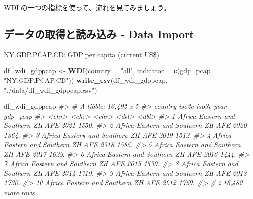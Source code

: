 \documentclass[
  xelatex, ja=standard]{bxjsbook}
\newenvironment{Shaded}{\begin{snugshade}}{\end{snugshade}}
\newcommand{\AttributeTok}[1]{\textcolor[rgb]{0.13,0.29,0.53}{#1}}
\newcommand{\CommentTok}[1]{\textcolor[rgb]{0.56,0.35,0.01}{\textit{#1}}}
\newcommand{\FunctionTok}[1]{\textcolor[rgb]{0.13,0.29,0.53}{\textbf{#1}}}
\newcommand{\NormalTok}[1]{#1}
\newcommand{\OtherTok}[1]{\textcolor[rgb]{0.56,0.35,0.01}{#1}}
\newcommand{\StringTok}[1]{\textcolor[rgb]{0.31,0.60,0.02}{#1}}
\theoremstyle{definition}
\theoremstyle{definition}
\theoremstyle{definition}
\theoremstyle{definition}
\theoremstyle{remark}
\begin{document}
WDI の一つの指標を使って、流れを見てみましょう。

\hypertarget{ux30c7ux30fcux30bfux306eux53d6ux5f97ux3068ux8aadux307fux8fbcux307f---data-import}{%
\subsection{データの取得と読み込み - Data Import}\label{ux30c7ux30fcux30bfux306eux53d6ux5f97ux3068ux8aadux307fux8fbcux307f---data-import}}

NY.GDP.PCAP.CD: GDP per capita (current US\$)

\begin{Shaded}
\begin{Highlighting}[]
\NormalTok{df\_wdi\_gdppcap }\OtherTok{\textless{}{-}} \FunctionTok{WDI}\NormalTok{(}\AttributeTok{country =} \StringTok{"all"}\NormalTok{, }\AttributeTok{indicator =} \FunctionTok{c}\NormalTok{(}\AttributeTok{gdp\_pcap =} \StringTok{"NY.GDP.PCAP.CD"}\NormalTok{))}
\FunctionTok{write\_csv}\NormalTok{(df\_wdi\_gdppcap, }\StringTok{"./data/df\_wdi\_gdppcap.csv"}\NormalTok{)}
\end{Highlighting}
\end{Shaded}

\begin{Shaded}
\begin{Highlighting}[]
\NormalTok{df\_wdi\_gdppcap}
\CommentTok{\#\textgreater{} \# A tibble: 16,492 x 5}
\CommentTok{\#\textgreater{}    country                     iso2c iso3c  year gdp\_pcap}
\CommentTok{\#\textgreater{}    \textless{}chr\textgreater{}                       \textless{}chr\textgreater{} \textless{}chr\textgreater{} \textless{}dbl\textgreater{}    \textless{}dbl\textgreater{}}
\CommentTok{\#\textgreater{}  1 Africa Eastern and Southern ZH    AFE    2021    1550.}
\CommentTok{\#\textgreater{}  2 Africa Eastern and Southern ZH    AFE    2020    1364.}
\CommentTok{\#\textgreater{}  3 Africa Eastern and Southern ZH    AFE    2019    1512.}
\CommentTok{\#\textgreater{}  4 Africa Eastern and Southern ZH    AFE    2018    1565.}
\CommentTok{\#\textgreater{}  5 Africa Eastern and Southern ZH    AFE    2017    1629.}
\CommentTok{\#\textgreater{}  6 Africa Eastern and Southern ZH    AFE    2016    1444.}
\CommentTok{\#\textgreater{}  7 Africa Eastern and Southern ZH    AFE    2015    1539.}
\CommentTok{\#\textgreater{}  8 Africa Eastern and Southern ZH    AFE    2014    1719.}
\CommentTok{\#\textgreater{}  9 Africa Eastern and Southern ZH    AFE    2013    1730.}
\CommentTok{\#\textgreater{} 10 Africa Eastern and Southern ZH    AFE    2012    1759.}
\CommentTok{\#\textgreater{} \# i 16,482 more rows}
\end{Highlighting}
\end{Shaded}
\end{document}
